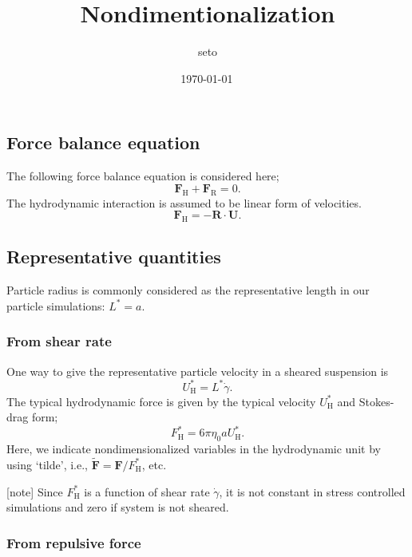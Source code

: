 \documentclass[fontsize=11pt]{scrartcl}
\title{Nondimentionalization}
\date{\shortdate\today \, \ampmtime }
\author{seto}
\begin{document}
\maketitle

\subsection*{Force balance equation}

The following force balance equation is considered here;
\begin{equation}
 \bm{F}_{\mathrm{H}} +  \bm{F}_{\mathrm{R}}  = 0.
\end{equation}
%
The hydrodynamic interaction is
assumed to be linear form of velocities.
%
\begin{equation}
 \bm{F}_{\mathrm{H}} = - \bm{R}\cdot\bm{U}.
\end{equation}

\subsection*{Representative quantities}

Particle radius is commonly considered
as the representative length in
our particle simulations: $L^{\ast} = a$.


\subsubsection*{From shear rate}

One way to give the representative particle velocity
in a sheared suspension is
\begin{equation}
U_{\mathrm{H}}^{\ast} = L^{\ast} \dot{\gamma}.
\end{equation}
%
%
The typical hydrodynamic force is given
by the typical velocity $U_{\mathrm{H}}^{\ast} $
and Stokes-drag form;
\begin{equation}
  F_{\mathrm{H}}^{\ast} = 6 \pi \eta_0 a U_{\mathrm{H}}^{\ast}.
\end{equation}
Here, we indicate nondimensionalized variables
in the hydrodynamic unit by using `tilde',
i.e.,
$\tilde{\bm{F}}  = \bm{F}/ F_{\mathrm{H}}^{\ast} $,
etc.
%

[note]
Since $F_{\mathrm{H}}^{\ast}$ is a function of shear rate $\dot{\gamma}$,
it is not constant in stress controlled simulations
and zero if system is not sheared.


\subsubsection*{From repulsive force}
\end{document}

